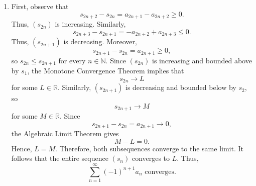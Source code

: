 \documentclass[12pt]{article}
\begin{document}
\begin{enumerate}[label=(\alph*)]
          Next, we construct our intervals as
          \[
              I_n = [s_{2n}, s_{2n+1}]
          \]
          Then
          \[
              I_{n+1} \subseteq I_n
          \]
          By the Nested Interval Property, there exists \( s \in \mathbb{R} \) such that
          \[
              s \in \bigcap_{n=1}^{\infty} I_n.
          \]
          Thus,
          \[
              s_{2n} \leq s \leq s_{2n+1}.
          \]
          Observe that
          \[
              s_{2n+1}-s_{2n}=a_{2n+1}.
          \]
          Because \(a_n\to0\),
          \[
              a_{2n+1}\to0.
          \]
          Since \(s\in I_n\),
          \[
              0\le s-s_{2n}\le a_{2n+1}
          \]
          and
          \[
              0\le s_{2n+1}-s\le a_{2n+1}.
          \]
          By the Squeeze Theorem,
          \[
              s_{2n}\to s
              \quad\text{and}\quad
              s_{2n+1}\to s.
          \]
          Because both the even and odd subsequences of \((s_n)\) converge to the same limit \(s\), the entire sequence \((s_n)\) converges to \(s\).
          Therefore,
          \[
              \sum_{n=1}^{\infty}(-1)^{n+1}a_n
              \text{ converges.}
          \]


    \item
          First, observe that
          \[
              s_{2n+2}-s_{2n}=a_{2n+1}-a_{2n+2}\ge0.
          \]
          Thus, \((s_{2n})\) is increasing.
          Similarly,
          \[
              s_{2n+3}-s_{2n+1}=-a_{2n+2}+a_{2n+3}\le0.
          \]
          Thus, \((s_{2n+1})\) is decreasing.
          Moreover,
          \[
              s_{2n+1}-s_{2n}=a_{2n+1}\ge0,
          \]
          so \(s_{2n}\le s_{2n+1}\) for every \(n\in\mathbb N\).
          Since \((s_{2n})\) is increasing and bounded above by \(s_1\), the Monotone Convergence Theorem implies that
          \[
              s_{2n}\to L
          \]
          for some \(L\in\mathbb R\).
          Similarly, \((s_{2n+1})\) is decreasing and bounded below by \(s_2\), so
          \[
              s_{2n+1}\to M
          \]
          for some \(M\in\mathbb R\).
          Since
          \[
              s_{2n+1}-s_{2n}=a_{2n+1}\to0,
          \]
          the Algebraic Limit Theorem gives
          \[
              M-L=0.
          \]
          Hence, \(L=M\).
          Therefore, both subsequences converge to the same limit. It follows that the entire sequence \((s_n)\) converges to \(L\).
          Thus,
          \[
              \sum_{n=1}^{\infty}(-1)^{n+1}a_n
              \text{ converges.}
          \]

\end{enumerate}
\end{document}
